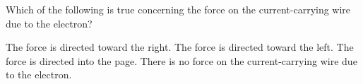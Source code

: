 \documentclass{../../oss-apphys-exam}
\begin{document}
\begin{multicols*}{2}
\begin{questions}
    \question Which of the following is true concerning the force on the
    current-carrying wire due to the electron?
    \begin{center}
    \end{center}
    \begin{choices}
      \choice The force is directed toward the right.
      \choice The force is directed toward the left.
      \choice The force is directed into the page.
      \choice There is no force on the current-carrying wire due to the
      electron.
    \end{choices}
    \columnbreak
    

\end{questions}
\end{multicols*}
\end{document}
